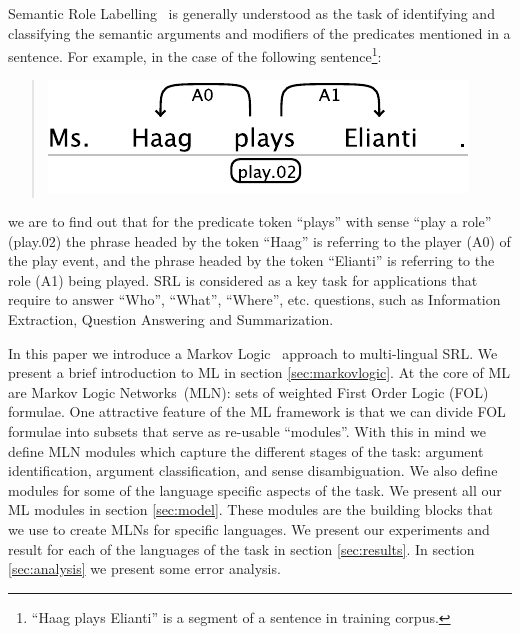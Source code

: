 
Semantic Role Labelling~\citep[SRL, ][]{marquez08srl} is generally understood as 
the task of identifying and classifying the semantic arguments and modifiers of 
the predicates mentioned in a sentence. For example, in the case of the 
following sentence\footnote{``Haag plays Elianti'' is a segment of a sentence in 
training corpus.}:
\begin{quote}
\begin{center}
    \includegraphics[scale=.63]{haag-example}
\end{center}
\end{quote}
we are to find out that for the predicate token {}``plays'' with sense ``play a 
role'' (play.02) the phrase headed by the token {}``Haag'' is referring to the 
player (A0) of the play event, and the phrase headed by the token {}``Elianti''  
is referring to the role (A1) being played. SRL is considered as a key task for 
applications that require to answer {}``Who'', {}``What'', {}``Where'', etc.  
questions, such as Information Extraction, Question Answering and Summarization.  

In this paper we introduce a Markov Logic~\citep[ML,][]{richardson06mln} approach to multi-lingual
SRL. We present a brief introduction to ML in 
section \ref{sec:markovlogic}.  At the core of ML are Markov Logic Networks~(MLN): sets of weighted First Order 
Logic (FOL) formulae. One attractive feature of the ML 
framework is that we can divide FOL formulae into subsets that serve as re-usable ``modules''. 
With this in mind we define MLN modules which capture the different stages of 
the task: argument identification, argument classification, and sense 
disambiguation. We also define modules for some of the language specific aspects of 
the task. We present all our ML modules in section 
\ref{sec:model}. These modules are the building blocks that we use to create 
MLNs for specific languages. We present our experiments and result for each of the 
languages of the task in section \ref{sec:results}. In section 
\ref{sec:analysis} we present some error analysis.

